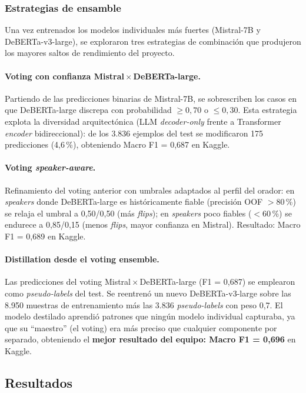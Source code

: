 \documentclass[12pt,a4paper]{article}
\begin{document}
\subsubsection{Estrategias de ensamble}

Una vez entrenados los modelos individuales más fuertes (Mistral-7B y DeBERTa-v3-large), se exploraron tres estrategias de combinación que produjeron los mayores saltos de rendimiento del proyecto.

\paragraph{Voting con confianza Mistral\,$\times$\,DeBERTa-large.}
Partiendo de las predicciones binarias de Mistral-7B, se sobrescriben los casos en que DeBERTa-large discrepa con probabilidad $\geq 0{,}70$ o $\leq 0{,}30$. Esta estrategia explota la diversidad arquitectónica (LLM \emph{decoder-only} frente a Transformer \emph{encoder} bidireccional): de los 3.836 ejemplos del test se modificaron 175 predicciones (4,6\,\%), obteniendo Macro F1 = 0,687 en Kaggle.

\paragraph{Voting \emph{speaker-aware}.}
Refinamiento del voting anterior con umbrales adaptados al perfil del orador: en \emph{speakers} donde DeBERTa-large es históricamente fiable (precisión OOF $>80$\,\%) se relaja el umbral a 0,50/0,50 (más \emph{flips}); en \emph{speakers} poco fiables ($<60$\,\%) se endurece a 0,85/0,15 (menos \emph{flips}, mayor confianza en Mistral). Resultado: Macro F1 = 0,689 en Kaggle.

\paragraph{Distillation desde el voting ensemble.}
Las predicciones del voting Mistral\,$\times$\,DeBERTa-large (F1 = 0,687) se emplearon como \emph{pseudo-labels} del test. Se reentrenó un nuevo DeBERTa-v3-large sobre las 8.950 muestras de entrenamiento más las 3.836 \emph{pseudo-labels} con peso 0,7. El modelo destilado aprendió patrones que ningún modelo individual capturaba, ya que su ``maestro'' (el voting) era más preciso que cualquier componente por separado, obteniendo el \textbf{mejor resultado del equipo: Macro F1 = 0,696} en Kaggle.

\subsection{Resultados}
\end{document}
